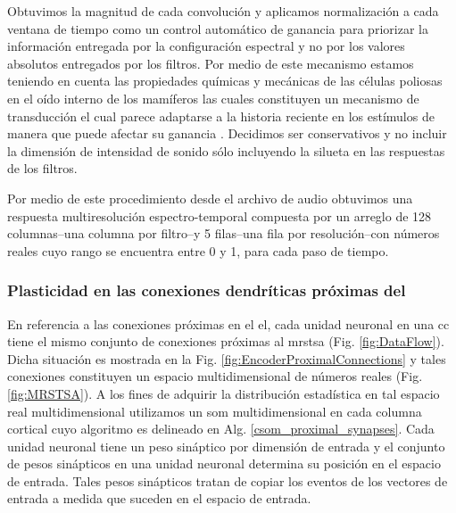 Obtuvimos la magnitud de cada convolución y aplicamos normalización a cada ventana de tiempo como un control automático de ganancia para priorizar la información entregada por la configuración espectral y no por los valores absolutos entregados por los filtros. Por medio de este mecanismo estamos teniendo en cuenta las propiedades químicas y mecánicas de las células poliosas en el oído interno de los mamíferos las cuales constituyen un mecanismo de transducción el cual parece adaptarse a la historia reciente en los estímulos de manera que puede afectar su ganancia \cite{eatock_2000,holt_2000,le_goff_2005}. Decidimos ser conservativos y no incluir la dimensión de intensidad de sonido sólo incluyendo la silueta en las respuestas de los filtros. 


Por medio de este procedimiento desde el archivo de audio obtuvimos una respuesta multiresolución espectro-temporal compuesta por un arreglo de 128 columnas--una columna por filtro--y 5 filas--una fila por resolución--con números reales cuyo rango se encuentra entre 0 y 1, para cada paso de tiempo.


\subsubsection{Plasticidad en las conexiones dendríticas próximas del }
\label{proximal_dendrites}

En referencia a las conexiones próximas en el \gls{el}, cada unidad neuronal en una \gls{cc} tiene el mismo conjunto de conexiones próximas al \gls{mrstsa} (Fig. \ref{fig:DataFlow}). Dicha situación es mostrada en la Fig. \ref{fig:EncoderProximalConnections} y tales conexiones constituyen un espacio multidimensional de números reales (Fig. \ref{fig:MRSTSA}). A los fines de adquirir la distribución estadística en tal espacio real multidimensional utilizamos un \gls{som} multidimensional en cada columna cortical cuyo algoritmo es delineado en Alg. \ref{csom_proximal_synapses}. Cada unidad neuronal tiene un peso sináptico por dimensión de entrada y el conjunto de pesos sinápticos en una unidad neuronal determina su posición en el espacio de entrada. Tales pesos sinápticos tratan de copiar los eventos de los vectores de entrada a medida que suceden en el espacio de entrada.

